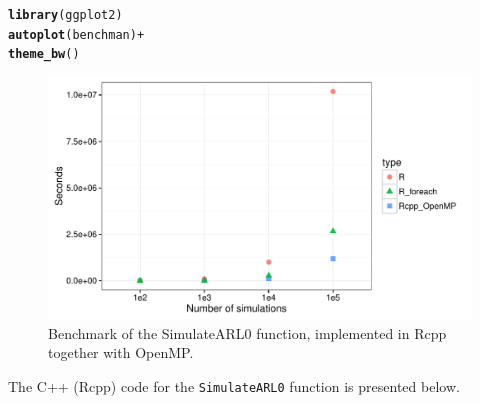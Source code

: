 \documentclass[a4paper,11pt,fleqn,twoside,notitlepage]{report}
\makeatletter
\def\maxwidth{ %
  \ifdim\Gin@nat@width>\linewidth
    \linewidth
  \else
    \Gin@nat@width
  \fi
}
\newcommand{\hlopt}[1]{\textcolor[rgb]{0,0,0}{#1}}%
\newcommand{\hlstd}[1]{\textcolor[rgb]{0.345,0.345,0.345}{#1}}%
\newcommand{\hlkwd}[1]{\textcolor[rgb]{0.737,0.353,0.396}{\textbf{#1}}}%
\newenvironment{kframe}{%
 \def\at@end@of@kframe{}%
 \ifinner\ifhmode%
  \def\at@end@of@kframe{\end{minipage}}%
  \begin{minipage}{\columnwidth}%
 \fi\fi%
 \def\FrameCommand##1{\hskip\@totalleftmargin \hskip-\fboxsep
 \colorbox{shadecolor}{##1}\hskip-\fboxsep
     \hskip-\linewidth \hskip-\@totalleftmargin \hskip\columnwidth}%
 \MakeFramed {\advance\hsize-\width
   \@totalleftmargin\z@ \linewidth\hsize
   \@setminipage}}%
 {\par\unskip\endMakeFramed%
 \at@end@of@kframe}
\newenvironment{knitrout}{}{} %
\makeatother
\begin{document}
\begin{knitrout}
\color{fgcolor}\begin{kframe}
\begin{alltt}
\hlkwd{library}\hlstd{(ggplot2)}
\hlkwd{autoplot}\hlstd{(benchman)} \hlopt{+}
  \hlkwd{theme_bw}\hlstd{()}
\end{alltt}
\end{kframe}\begin{figure}
\includegraphics[width=\maxwidth]{figure/BenchmarkFigure-1} \caption[Benchmark of the SimulateARL0 function, implemented in Rcpp together with OpenMP]{Benchmark of the SimulateARL0 function, implemented in Rcpp together with OpenMP. }\label{fig:BenchmarkFigure}
\end{figure}


\end{knitrout}
The C++ (Rcpp) code for the \texttt{SimulateARL0} function is presented below.
\end{document}
